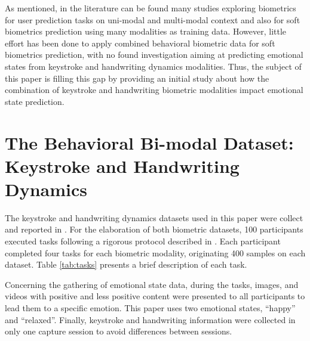 \documentclass[conference]{IEEEtran}
\begin{document}
As mentioned, in the literature can be found many studies exploring biometrics for user prediction tasks on uni-modal and multi-modal context and also for soft biometrics prediction using many modalities as training data.
However, little effort has been done to apply combined behavioral biometric data for soft biometrics prediction, with no found investigation aiming at predicting emotional states from keystroke and handwriting dynamics modalities. Thus, the subject of this paper is filling this gap by providing an initial study about how the combination of keystroke and handwriting biometric modalities impact emotional state prediction.



\section{The Behavioral Bi-modal Dataset: Keystroke and Handwriting Dynamics}
\label{dataset}

The keystroke and handwriting dynamics datasets used in this paper were collect and reported in \cite{cheng-thesis, cheng-hw-gender, cheng-emotional}. For the elaboration of both biometric datasets, 100 participants executed tasks following a rigorous protocol described in \cite{cheng-thesis}. Each participant completed four tasks for each biometric modality, originating 400 samples on each dataset. Table \ref{tab:tasks} presents a brief description of each task.

Concerning the gathering of emotional state data, during the tasks, images, and videos with positive and less positive content were presented to all participants to lead them to a specific emotion. This paper uses two emotional states, ``happy'' and ``relaxed''. Finally, keystroke and handwriting information were collected in only one capture session to avoid differences between sessions.
\end{document}
